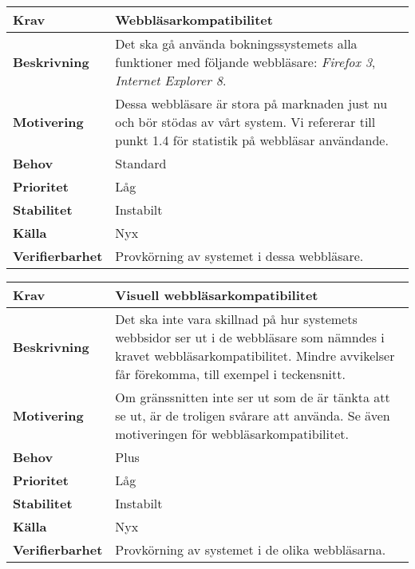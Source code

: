 \documentclass[a4paper, twoside, 11pt, titlepage]{article}
\begin{document}
		\begin{tabular} { p{2.6cm} p{12.5cm} }
			\hline
			\sffamily\textbf{Krav} & Webbläsarkompatibilitet  \\
			\hline
			\sffamily\textbf{Beskrivning} & Det ska gå använda bokningssystemets alla funktioner med följande webbläsare: \emph{Firefox 3}, \emph{Internet Explorer 8}.  \\
			\hline
			\sffamily\textbf{Motivering} & Dessa webbläsare är stora på marknaden just nu och bör stödas av vårt system. Vi refererar till punkt 1.4 för statistik på webbläsar användande.  \\
			\hline
			\sffamily\textbf{Behov} & Standard  \\
			\hline
			\sffamily\textbf{Prioritet} & Låg  \\
			\hline
			\sffamily\textbf{Stabilitet} & Instabilt  \\
			\hline
			\sffamily\textbf{Källa} & Nyx  \\
			\hline
			\sffamily\textbf{Verifierbarhet} & Provkörning av systemet i dessa webbläsare.  \\
			\hline
		\end{tabular}
		\vspace{6mm}

		\begin{tabular} { p{2.6cm} p{12.5cm} }
			\hline
			\sffamily\textbf{Krav} & Visuell webbläsarkompatibilitet  \\
			\hline
			\sffamily\textbf{Beskrivning} & Det ska inte vara skillnad på hur systemets webbsidor ser ut i de webbläsare som nämndes i kravet webbläsarkompatibilitet. Mindre avvikelser får förekomma, till exempel i teckensnitt.  \\
			\hline
			\sffamily\textbf{Motivering} & Om gränssnitten inte ser ut som de är tänkta att se ut, är de troligen svårare att använda. Se även motiveringen för webbläsarkompatibilitet.  \\
			\hline
			\sffamily\textbf{Behov} & Plus  \\
			\hline
			\sffamily\textbf{Prioritet} & Låg  \\
			\hline
			\sffamily\textbf{Stabilitet} & Instabilt  \\
			\hline
			\sffamily\textbf{Källa} & Nyx  \\
			\hline
			\sffamily\textbf{Verifierbarhet} & Provkörning av systemet i de olika webbläsarna.  \\
			\hline
		\end{tabular}
		\vspace{6mm}
\end{document}
